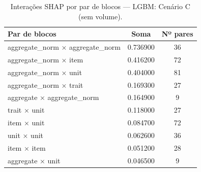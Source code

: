 \begin{table}[htbp]
\caption{Interações SHAP por par de blocos — LGBM: Cenário C (sem volume).}
\label{tab:intlgbm_C}
\centering
\small
\begin{tabular}{lcc}
\toprule
Par de blocos & Soma & Nº pares \\
\midrule
aggregate\_norm × aggregate\_norm & 0.736900 & 36 \\
aggregate\_norm × item & 0.416200 & 72 \\
aggregate\_norm × unit & 0.404000 & 81 \\
aggregate\_norm × trait & 0.169300 & 27 \\
aggregate × aggregate\_norm & 0.164900 & 9 \\
trait × unit & 0.118000 & 27 \\
item × unit & 0.084700 & 72 \\
unit × unit & 0.062600 & 36 \\
item × item & 0.051200 & 28 \\
aggregate × unit & 0.046500 & 9 \\
\bottomrule
\end{tabular}
\end{table}
